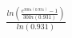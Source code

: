 \documentclass[preview]{standalone}
\begin{document}
\begin{align*}
\frac{ ln(\frac{e^{30ln(0.931)}-1} {30ln(0.931)} ) } {ln(0.931)}
\end{align*}
\end{document}
